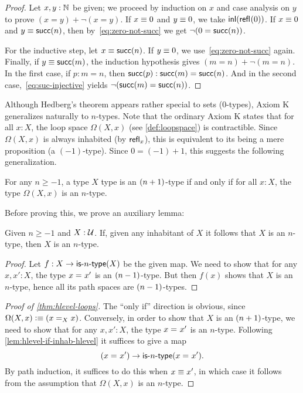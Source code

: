 \begin{proof}
  Let $x, y : \Nat$ be given; we proceed by induction on $x$ and case analysis on $y$ to prove $(x=y)+\neg(x=y)$.
  If $x \jdeq 0$ and $y \jdeq 0$, we take $\inl(\refl{}(0))$.
  If $x \jdeq 0$ and $y \jdeq \suc(n)$, then by~\eqref{eq:zero-not-succ} we get $\neg (0 = \suc (n))$.

  For the inductive step, let $x \jdeq \suc (n)$.
  If $y \jdeq 0$, we use~\eqref{eq:zero-not-succ} again.
  Finally, if $y \jdeq \suc (m)$, the induction hypothesis gives $(m = n)+\neg(m = n)$.
  In the first case, if $p:m=n$, then $\ap \suc p:\suc(m)=\suc(n)$.
  And in the second case,~\eqref{eq:suc-injective} yields $\neg(\suc(m)=\suc(n))$.
\end{proof}

Although Hedberg's theorem appears rather special to sets ($0$-types), Axiom K generalizes naturally to $n$-types.
Note that the ordinary Axiom K states that for all $x:X$, the loop space $\Omega(X,x)$ (see \cref{def:loopspace}) is contractible.
Since $\Omega(X,x)$ is always inhabited (by $\refl{x}$), this is equivalent to its being a mere proposition (a $(-1)$-type).
Since $0 = (-1)+1$, this suggests the following generalization.

\begin{thm}\label{thm:hlevel-loops}
  For any $n\geq -1$, a type $X$ type is an $\nplusone$-type if and only if for all $x : X$, the type $\Omega(X, x)$ is an $n$-type.
\end{thm}

Before proving this, we prove an auxiliary lemma:

\begin{lem}\label{lem:hlevel-if-inhab-hlevel}
  Given $n \geq -1$ and $X : \type$.
  If, given any inhabitant of $X$ it follows that $X$ is an $n$-type, then $X$ is an $n$-type.
\end{lem}
\begin{proof}
  Let $f : X \to \istype{n}(X)$ be the given map.
  We need to show that for any $x, x' : X$, the type $\id{x}{x'}$ is an $\nminusone$-type.
  But then $f(x)$ shows that $X$ is an $n$-type, hence all its path spaces are $\nminusone$-types.
\end{proof}

\begin{proof}[Proof of \autoref{thm:hlevel-loops}]
  The ``only if'' direction is obvious, since $\Omega(X,x)\defeq (\id[X]xx)$.
  Conversely, in order to show that $X$ is an $\nplusone$-type, we need to show that for any $x, x' : X$, the type $\id{x}{x'}$ is an $n$-type.
  Following \autoref{lem:hlevel-if-inhab-hlevel} it suffices to give a map
  \[ (\id{x}{x'}) \to \istype{n}(\id{x}{x'})  .\]
  By path induction, it suffices to do this when $x\jdeq x'$, in which case it follows from the assumption that $\Omega(X, x)$ is an $n$-type.
\end{proof}

